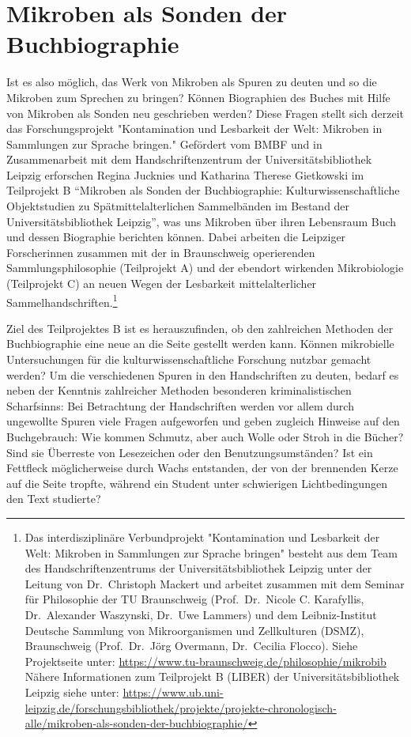 \documentclass[a4paper,
fontsize=11pt,
oneside,
numbers=noperiodatend,
parskip=half-,
bibliography=totoc,
final
]{scrartcl}
\begin{document}
\hypertarget{mikroben-als-sonden-der-buchbiographie}{%
\section{Mikroben als Sonden der
Buchbiographie}\label{mikroben-als-sonden-der-buchbiographie}}

Ist es also möglich, das Werk von Mikroben als Spuren zu deuten und so
die Mikroben zum Sprechen zu bringen? Können Biographien des Buches mit
Hilfe von Mikroben als Sonden neu geschrieben werden? Diese Fragen
stellt sich derzeit das Forschungsprojekt "Kontamination und Lesbarkeit
der Welt: Mikroben in Sammlungen zur Sprache bringen." Gefördert vom
BMBF und in Zusammenarbeit mit dem Handschriftenzentrum der
Universitätsbibliothek Leipzig erforschen Regina Jucknies und Katharina
Therese Gietkowski im Teilprojekt B \enquote{Mikroben als Sonden der
Buchbiographie: Kulturwissenschaftliche Objektstudien zu
Spätmittelalterlichen Sammelbänden im Bestand der Universitätsbibliothek
Leipzig}, was uns Mikroben über ihren Lebensraum Buch und dessen
Biographie berichten können. Dabei arbeiten die Leipziger Forscherinnen
zusammen mit der in Braunschweig operierenden Sammlungsphilosophie
(Teilprojekt A) und der ebendort wirkenden Mikrobiologie (Teilprojekt C)
an neuen Wegen der Lesbarkeit mittelalterlicher
Sammelhandschriften.\footnote{Das interdisziplinäre Verbundprojekt
  "Kontamination und Lesbarkeit der Welt: Mikroben in Sammlungen zur
  Sprache bringen" besteht aus dem Team des Handschriftenzentrums der
  Universitätsbibliothek Leipzig unter der Leitung von Dr.~Christoph
  Mackert und arbeitet zusammen mit dem Seminar für Philosophie der TU
  Braunschweig (Prof.~Dr.~Nicole C. Karafyllis, Dr.~Alexander Waszynski,
  Dr.~Uwe Lammers) und dem Leibniz-Institut Deutsche Sammlung von
  Mikroorganismen und Zellkulturen (DSMZ), Braunschweig (Prof.~Dr.~Jörg
  Overmann, Dr.~Cecilia Flocco). Siehe Projektseite unter:
  \url{https://www.tu-braunschweig.de/philosophie/mikrobib} Nähere
  Informationen zum Teilprojekt B (LIBER) der Universitätsbibliothek
  Leipzig siehe unter:
  \url{https://www.ub.uni-leipzig.de/forschungsbibliothek/projekte/projekte-chronologisch-alle/mikroben-als-sonden-der-buchbiographie/}}

Ziel des Teilprojektes B ist es herauszufinden, ob den zahlreichen
Methoden der Buchbiographie eine neue an die Seite gestellt werden kann.
Können mikrobielle Untersuchungen für die kulturwissenschaftliche
Forschung nutzbar gemacht werden? Um die verschiedenen Spuren in den
Handschriften zu deuten, bedarf es neben der Kenntnis zahlreicher
Methoden besonderen kriminalistischen Scharfsinns: Bei Betrachtung der
Handschriften werden vor allem durch ungewollte Spuren viele Fragen
aufgeworfen und geben zugleich Hinweise auf den Buchgebrauch: Wie kommen
Schmutz, aber auch Wolle oder Stroh in die Bücher? Sind sie Überreste
von Lesezeichen oder den Benutzungsumständen? Ist ein Fettfleck
möglicherweise durch Wachs entstanden, der von der brennenden Kerze auf
die Seite tropfte, während ein Student unter schwierigen
Lichtbedingungen den Text studierte?
\end{document}
